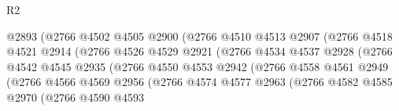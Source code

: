 \begin{lexlean}{R2}
\begin{coremodule}
                                    @2893
                                    (@2766
                                      @4502
                                      @4505
                                      @2900
                                      (@2766
                                        @4510
                                        @4513
                                        @2907
                                        (@2766
                                          @4518
                                          @4521
                                          @2914
                                          (@2766
                                            @4526
                                            @4529
                                            @2921
                                            (@2766
                                              @4534
                                              @4537
                                              @2928
                                              (@2766
                                                @4542
                                                @4545
                                                @2935
                                                (@2766
                                                  @4550
                                                  @4553
                                                  @2942
                                                  (@2766
                                                    @4558
                                                    @4561
                                                    @2949
                                                    (@2766
                                                      @4566
                                                      @4569
                                                      @2956
                                                      (@2766
                                                        @4574
                                                        @4577
                                                        @2963
                                                        (@2766
                                                          @4582
                                                          @4585
                                                          @2970
                                                          (@2766
                                                            @4590
                                                            @4593

\end{coremodule}
\end{lexlean}
